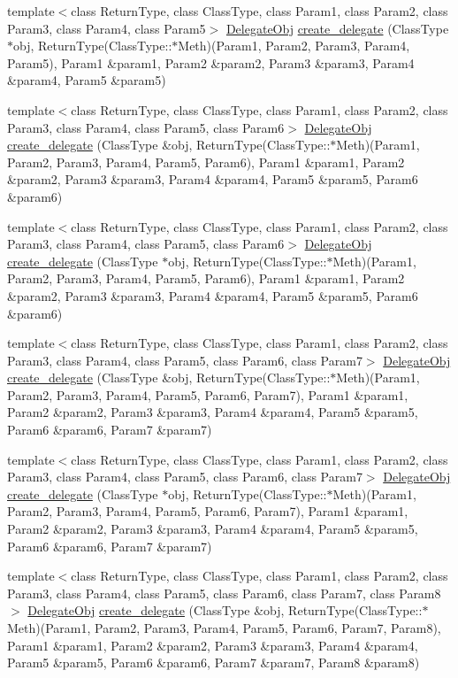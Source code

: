 \begin{CompactItemize}
\item 
template$<$class Return\-Type, class Class\-Type, class Param1, class Param2, class Param3, class Param4, class Param5$>$ \hyperlink{namespaceDL_a0}{Delegate\-Obj} \hyperlink{namespaceDL_a14}{create\_\-delegate} (Class\-Type $\ast$obj, Return\-Type(Class\-Type::$\ast$Meth)(Param1, Param2, Param3, Param4, Param5), Param1 \&param1, Param2 \&param2, Param3 \&param3, Param4 \&param4, Param5 \&param5)
\item 
template$<$class Return\-Type, class Class\-Type, class Param1, class Param2, class Param3, class Param4, class Param5, class Param6$>$ \hyperlink{namespaceDL_a0}{Delegate\-Obj} \hyperlink{namespaceDL_a15}{create\_\-delegate} (Class\-Type \&obj, Return\-Type(Class\-Type::$\ast$Meth)(Param1, Param2, Param3, Param4, Param5, Param6), Param1 \&param1, Param2 \&param2, Param3 \&param3, Param4 \&param4, Param5 \&param5, Param6 \&param6)
\item 
template$<$class Return\-Type, class Class\-Type, class Param1, class Param2, class Param3, class Param4, class Param5, class Param6$>$ \hyperlink{namespaceDL_a0}{Delegate\-Obj} \hyperlink{namespaceDL_a16}{create\_\-delegate} (Class\-Type $\ast$obj, Return\-Type(Class\-Type::$\ast$Meth)(Param1, Param2, Param3, Param4, Param5, Param6), Param1 \&param1, Param2 \&param2, Param3 \&param3, Param4 \&param4, Param5 \&param5, Param6 \&param6)
\item 
template$<$class Return\-Type, class Class\-Type, class Param1, class Param2, class Param3, class Param4, class Param5, class Param6, class Param7$>$ \hyperlink{namespaceDL_a0}{Delegate\-Obj} \hyperlink{namespaceDL_a17}{create\_\-delegate} (Class\-Type \&obj, Return\-Type(Class\-Type::$\ast$Meth)(Param1, Param2, Param3, Param4, Param5, Param6, Param7), Param1 \&param1, Param2 \&param2, Param3 \&param3, Param4 \&param4, Param5 \&param5, Param6 \&param6, Param7 \&param7)
\item 
template$<$class Return\-Type, class Class\-Type, class Param1, class Param2, class Param3, class Param4, class Param5, class Param6, class Param7$>$ \hyperlink{namespaceDL_a0}{Delegate\-Obj} \hyperlink{namespaceDL_a18}{create\_\-delegate} (Class\-Type $\ast$obj, Return\-Type(Class\-Type::$\ast$Meth)(Param1, Param2, Param3, Param4, Param5, Param6, Param7), Param1 \&param1, Param2 \&param2, Param3 \&param3, Param4 \&param4, Param5 \&param5, Param6 \&param6, Param7 \&param7)
\item 
template$<$class Return\-Type, class Class\-Type, class Param1, class Param2, class Param3, class Param4, class Param5, class Param6, class Param7, class Param8$>$ \hyperlink{namespaceDL_a0}{Delegate\-Obj} \hyperlink{namespaceDL_a19}{create\_\-delegate} (Class\-Type \&obj, Return\-Type(Class\-Type::$\ast$Meth)(Param1, Param2, Param3, Param4, Param5, Param6, Param7, Param8), Param1 \&param1, Param2 \&param2, Param3 \&param3, Param4 \&param4, Param5 \&param5, Param6 \&param6, Param7 \&param7, Param8 \&param8)

\end{CompactItemize}
